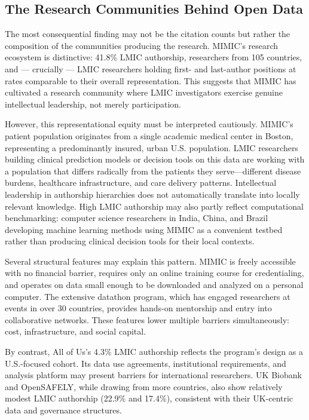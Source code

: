 \documentclass[11pt]{article}
\begin{document}
\subsection{The Research Communities Behind Open Data}

The most consequential finding may not be the citation counts but rather the composition of the communities producing the research.
MIMIC's research ecosystem is distinctive: 41.8\% LMIC authorship, researchers from 105 countries, and --- crucially --- LMIC researchers holding first- and last-author positions at rates comparable to their overall representation.
This suggests that MIMIC has cultivated a research community where LMIC investigators exercise genuine intellectual leadership, not merely participation.

However, this representational equity must be interpreted cautiously. MIMIC's patient population originates from a single academic medical center in Boston, representing a predominantly insured, urban U.S. population. LMIC researchers building clinical prediction models or decision tools on this data are working with a population that differs radically from the patients they serve---different disease burdens, healthcare infrastructure, and care delivery patterns. Intellectual leadership in authorship hierarchies does not automatically translate into locally relevant knowledge. High LMIC authorship may also partly reflect computational benchmarking: computer science researchers in India, China, and Brazil developing machine learning methods using MIMIC as a convenient testbed rather than producing clinical decision tools for their local contexts.

Several structural features may explain this pattern.
MIMIC is freely accessible with no financial barrier, requires only an online training course for credentialing, and operates on data small enough to be downloaded and analyzed on a personal computer.
The extensive datathon program, which has engaged researchers at events in over 30 countries, provides hands-on mentorship and entry into collaborative networks.
These features lower multiple barriers simultaneously: cost, infrastructure, and social capital.

By contrast, All of Us's 4.3\% LMIC authorship reflects the program's design as a U.S.-focused cohort.
Its data use agreements, institutional requirements, and analysis platform may present barriers for international researchers.
UK Biobank and OpenSAFELY, while drawing from more countries, also show relatively modest LMIC authorship (22.9\% and 17.4\%), consistent with their UK-centric data and governance structures.
\end{document}
